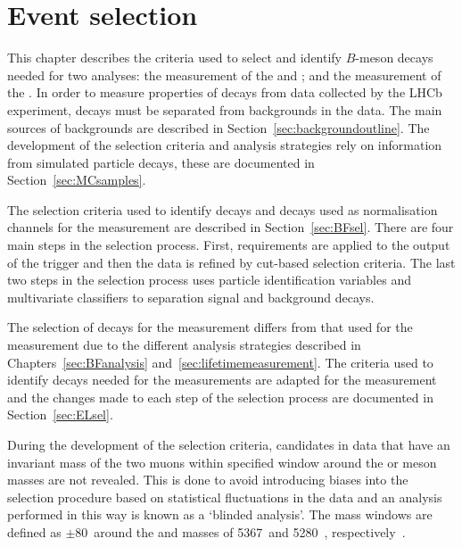 \chapter{{\bf Event selection}}
\label{selection_chapter}

This chapter describes the criteria used to select and identify $B$-meson decays needed for two analyses: the measurement of the \bdmumu and \bsmumu \BFs; and the measurement of the \bsmumu \el. 
In order to measure properties of \bmumu decays from data collected by the LHCb experiment, \bmumu decays must be separated from backgrounds in the data. The main sources of backgrounds are described in Section~\ref{sec:backgroundoutline}.
The development of the selection criteria and analysis strategies rely on information from simulated particle decays, these are documented in Section~\ref{sec:MCsamples}. 


The selection criteria used to identify \bmumu decays and decays used as normalisation channels for the \BF measurement are described in Section~\ref{sec:BFsel}. There are four main steps in the selection process. First, requirements are applied to the output of the trigger and then the data is refined by cut-based selection criteria. The last two steps in the selection process uses particle identification variables and multivariate classifiers to separation signal and background decays.

The selection of decays for the \el measurement differs from that used for the \BF measurement due to the different analysis strategies described in Chapters~\ref{sec:BFanalysis} and~\ref{sec:lifetimemeasurement}. The criteria used to identify decays needed for the \BF measurements are adapted for the \el measurement and the changes made to each step of the \BF selection process are documented in Section~\ref{sec:ELsel}. %

During the development of the selection criteria, \bmumu candidates in data that have an invariant mass of the two muons within specified window around the \bs or \bd meson masses are not revealed. This is done to avoid introducing biases into the selection procedure based on statistical fluctuations in the data and an analysis performed in this way is known as a `blinded analysis'. The mass windows are defined as $\pm 80$~\mevcc around the \bs and \bd masses of 5367~\mevcc and 5280~\mevcc, respectively~\cite{Olive:2016xmw}.

